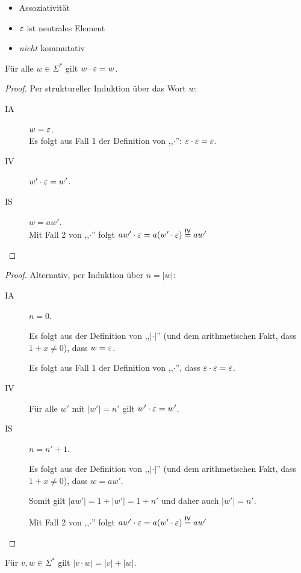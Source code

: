 \begin{itemize}
\item Assoziativität
\item $\varepsilon$ ist neutrales Element
\item \emph{nicht} kommutativ
\end{itemize}
\begin{lemma}
  Für alle $w \in \Sigma^*$ gilt $w \cdot \varepsilon = w$.
\end{lemma}
\begin{proof}
  Per struktureller Induktion über das Wort $w$:
  \begin{description}
  \item[IA] $w = \varepsilon$. \\
      Es folgt aus Fall 1 der Definition von ,,$\cdot$'': $\varepsilon \cdot \varepsilon = \varepsilon$.
  \item[IV] $w' \cdot \varepsilon = w'$.
  \item[IS] $w = aw'$.
    \\
    Mit Fall 2 von ,,$\cdot$'' folgt $aw' \cdot \varepsilon = a (w' \cdot \varepsilon) \stackrel{\mathsf{IV}}{=} aw'$
  \end{description}
\end{proof}
\begin{proof}
  Alternativ, per Induktion über $n = |w|$:
  \begin{description}
  \item[IA] $n = 0$.

    Es folgt aus der Definition von ,,$|\cdot|$'' (und dem arithmetischen Fakt, dass $1 + x \not = 0$), dass $w = \varepsilon$.

    Es folgt aus Fall 1 der Definition von ,,$\cdot$'', dass $\varepsilon \cdot \varepsilon = \varepsilon$.
  \item[IV] Für alle $w'$ mit $|w'| = n'$ gilt $w' \cdot \varepsilon = w'$.
  \item[IS] $n = n' + 1$.

    Es folgt aus der Definition von ,,$|\cdot|$'' (und dem arithmetischen Fakt, dass $1 + x \not = 0$), dass $w = aw'$.

    Somit gilt $|aw'| = 1 + |w'| = 1 + n'$ und daher auch $|w'| = n'$.

    Mit Fall 2 von ,,$\cdot$'' folgt $aw' \cdot \varepsilon = a (w' \cdot \varepsilon) \stackrel{\mathsf{IV}}{=} aw'$
  \end{description}
\end{proof}
\begin{lemma}
  Für $v,w \in \Sigma^*$ gilt $|v\cdot w| = |v| + |w|$.
\end{lemma}
